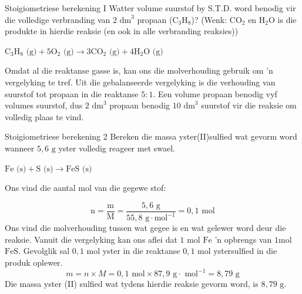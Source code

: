       \begin{wex}{Stoigiometriese berekening I }
{
Watter volume suurstof by S.T.D. word benodig vir die volledige verbranding van $2 {\text{ dm}}^{3}$ propaan ($\text{C}{}_{3}\text{H}{}_{8}$)? (Wenk: $\text{CO}{}_{2}$ en $\text{H}{}_{2}\text{O}$ is die produkte in hierdie reaksie (en ook in alle verbranding reaksies))
      }
{
${\text{C}}_{3}{\text{H}}_{8} \text{ (g)} + 5{\text{O}}_{2} \text{ (g)} \to 3\text{C}{\text{O}}_{2} \text{ (g)} + 4{\text{H}}_{2}\text{O} \text{ (g)}$
       
Omdat al die reaktanse gasse is, kan ons die molverhouding gebruik om  'n vergelyking te tref. Uit die gebalanseerde vergelyking is die verhouding van suurstof tot propaan in die reaktanse  $5:1$.
      \label{m38712*id284304}Een volume propaan benodig vyf volumes suurstof, dus $2 {\text{ dm}}^{3}$ propaan benodig $10 {\text{ dm}}^{3}$ suurstof vir die reaksie om volledig plaas te vind.
}
    \end{wex}
    \noindent
\label{m38712*secfhsst!!!underscore!!!id1972} 
      \begin{wex}{Stoigiometriese berekening 2 }
{
      \label{m38712*probfhsst!!!underscore!!!id1973}
      \label{m38712*id284347}Bereken die massa yster(II)sulfied wat gevorm word wanneer $5,6 \text{ g}$ yster volledig reageer met swael.
      }
{
      \label{m38712*id284378}$\text{Fe} \text{ (s)} + \text{S} \text{ (s)} \to \text{FeS} \text{ (s)}$
       
        Ons vind die aantal mol van die gegewe stof:
      \label{m38712*id284430}\nopagebreak\noindent{}
        
    \begin{equation*}
    \text{n}=\frac{\text{m}}{\text{M}}=\frac{5,6 \text{ g}}{55,8 \text{ g} \cdot \text{mol}^{-1}} = 0,1\text{ mol}
      \end{equation*}
       Ons vind die molverhouding tussen wat gegee is en wat gelewer word deur die reaksie. Vanuit die vergelyking kan ons aflei dat $1 \text{ mol}$ $\text{Fe}$   'n opbrengs van  $1 \text{mol}$ $\text{FeS}$. Gevolglik sal $0,1\text{ mol}$ yster in die reaktanse $0,1 \text{ mol}$ ystersulfied in die produk oplewer. 
      \label{m38712*id284499}\nopagebreak\noindent{}
    \begin{equation*}
    m=n \times M = 0,1 \text{ mol} \times 87,9 \text{ g} \cdot \text{ mol}^{-1} = 8,79 \text{ g}
      \end{equation*}
      \label{m38712*id284548}Die massa yster (II) sulfied wat tydens hierdie reaksie gevorm word, is $8,79 \text{ g}$. 
}
    \end{wex}
    \noindent
